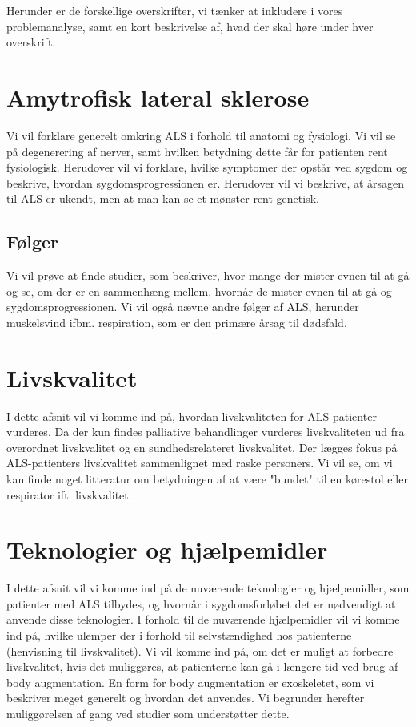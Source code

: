 Herunder er de forskellige overskrifter, vi tænker at inkludere i vores problemanalyse, samt en kort beskrivelse af, hvad der skal høre under hver overskrift. 

\section{Amytrofisk lateral sklerose}
Vi vil forklare generelt omkring ALS i forhold til anatomi og fysiologi. Vi vil se på degenerering af nerver, samt hvilken betydning dette får for patienten rent fysiologisk. Herudover vil vi forklare, hvilke symptomer der opstår ved sygdom og beskrive, hvordan sygdomsprogressionen er. Herudover vil vi beskrive, at årsagen til ALS er ukendt, men at man kan se et mønster rent genetisk.

\subsection{Følger}
Vi vil prøve at finde studier, som beskriver, hvor mange der mister evnen til at gå og se, om der er en sammenhæng mellem, hvornår de mister evnen til at gå og sygdomsprogressionen. Vi vil også nævne andre følger af ALS, herunder muskelsvind ifbm. respiration, som er den primære årsag til dødsfald. 

\section{Livskvalitet}
I dette afsnit vil vi komme ind på, hvordan livskvaliteten for ALS-patienter vurderes. Da der kun findes palliative behandlinger vurderes livskvaliteten ud fra overordnet livskvalitet og en sundhedsrelateret livskvalitet. Der lægges fokus på ALS-patienters livskvalitet sammenlignet med raske personers. Vi vil se, om vi kan finde noget litteratur om betydningen af at være "bundet" til en kørestol eller respirator ift. livskvalitet. 

\section{Teknologier og hjælpemidler}
I dette afsnit vil vi komme ind på de nuværende teknologier og hjælpemidler, som patienter med ALS tilbydes, og hvornår i sygdomsforløbet det er nødvendigt at anvende disse teknologier. I forhold til de nuværende hjælpemidler vil vi komme ind på, hvilke ulemper der i forhold til selvstændighed hos patienterne (henvisning til livskvalitet). Vi vil komme ind på, om det er muligt at forbedre livskvalitet, hvis det muliggøres, at patienterne kan gå i længere tid ved brug af body augmentation. En form for body augmentation er exoskeletet, som vi beskriver meget generelt og hvordan det anvendes. Vi begrunder herefter muliggørelsen af gang ved studier som understøtter dette. 

